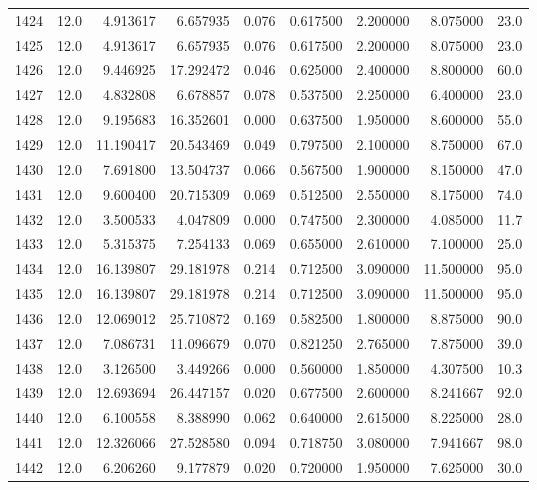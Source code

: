 \begin{tabular}{lrrrrrrrr}
1424 &   12.0 &   4.913617 &   6.657935 &  0.076 &  0.617500 &  2.200000 &   8.075000 &   23.0 \\
1425 &   12.0 &   4.913617 &   6.657935 &  0.076 &  0.617500 &  2.200000 &   8.075000 &   23.0 \\
1426 &   12.0 &   9.446925 &  17.292472 &  0.046 &  0.625000 &  2.400000 &   8.800000 &   60.0 \\
1427 &   12.0 &   4.832808 &   6.678857 &  0.078 &  0.537500 &  2.250000 &   6.400000 &   23.0 \\
1428 &   12.0 &   9.195683 &  16.352601 &  0.000 &  0.637500 &  1.950000 &   8.600000 &   55.0 \\
1429 &   12.0 &  11.190417 &  20.543469 &  0.049 &  0.797500 &  2.100000 &   8.750000 &   67.0 \\
1430 &   12.0 &   7.691800 &  13.504737 &  0.066 &  0.567500 &  1.900000 &   8.150000 &   47.0 \\
1431 &   12.0 &   9.600400 &  20.715309 &  0.069 &  0.512500 &  2.550000 &   8.175000 &   74.0 \\
1432 &   12.0 &   3.500533 &   4.047809 &  0.000 &  0.747500 &  2.300000 &   4.085000 &   11.7 \\
1433 &   12.0 &   5.315375 &   7.254133 &  0.069 &  0.655000 &  2.610000 &   7.100000 &   25.0 \\
1434 &   12.0 &  16.139807 &  29.181978 &  0.214 &  0.712500 &  3.090000 &  11.500000 &   95.0 \\
1435 &   12.0 &  16.139807 &  29.181978 &  0.214 &  0.712500 &  3.090000 &  11.500000 &   95.0 \\
1436 &   12.0 &  12.069012 &  25.710872 &  0.169 &  0.582500 &  1.800000 &   8.875000 &   90.0 \\
1437 &   12.0 &   7.086731 &  11.096679 &  0.070 &  0.821250 &  2.765000 &   7.875000 &   39.0 \\
1438 &   12.0 &   3.126500 &   3.449266 &  0.000 &  0.560000 &  1.850000 &   4.307500 &   10.3 \\
1439 &   12.0 &  12.693694 &  26.447157 &  0.020 &  0.677500 &  2.600000 &   8.241667 &   92.0 \\
1440 &   12.0 &   6.100558 &   8.388990 &  0.062 &  0.640000 &  2.615000 &   8.225000 &   28.0 \\
1441 &   12.0 &  12.326066 &  27.528580 &  0.094 &  0.718750 &  3.080000 &   7.941667 &   98.0 \\
1442 &   12.0 &   6.206260 &   9.177879 &  0.020 &  0.720000 &  1.950000 &   7.625000 &   30.0 \\

\end{tabular}
